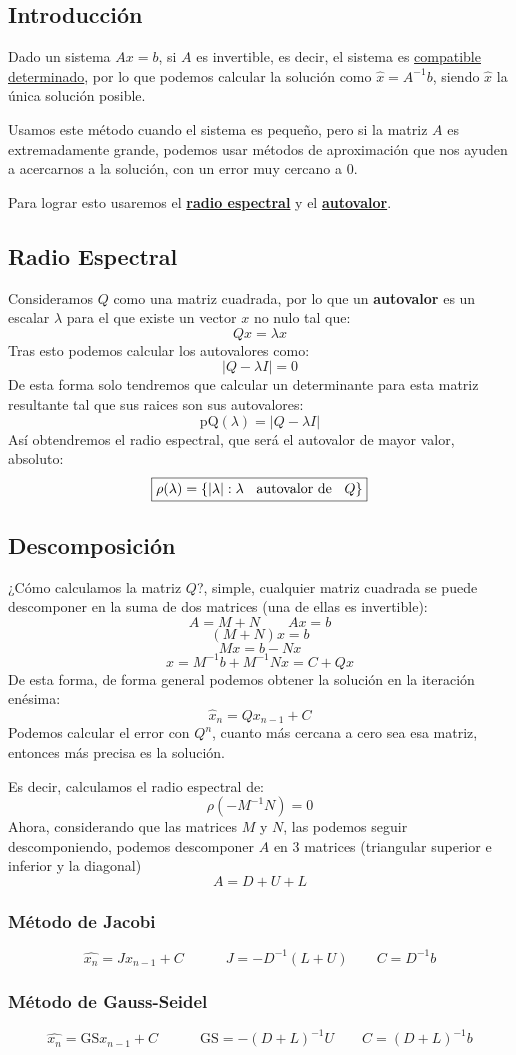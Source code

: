 \subsection{Introducción}
Dado un sistema \(Ax=b\), si \(A\) es invertible, es decir, el sistema es \underline{compatible determinado}, por lo que podemos calcular la solución como \(\hat{x} = A^{-1}b\), siendo \(\hat{x}\) la única solución posible. \par
Usamos este método cuando el sistema es pequeño, pero si la matriz \(A\) es extremadamente grande, podemos usar métodos de aproximación que nos ayuden a acercarnos a la solución, con un error muy cercano a 0. \par
Para lograr esto usaremos el \underline{\textbf{radio espectral}} y el \underline{\textbf{autovalor}}.
\subsection{Radio Espectral}
Consideramos \(Q\) como una matriz cuadrada, por lo que un \textbf{autovalor} es un escalar \(\lambda\) para el que existe un vector \(x\) no nulo tal que:
\[
        Qx = \lambda x
\]
Tras esto podemos calcular los autovalores como:
\[
        \boxed{\left | Q - \lambda I \right | = 0}
\]
De esta forma solo tendremos que calcular un determinante para esta matriz resultante tal que sus raices son sus autovalores:
\[
        \boxed{\text{pQ}(\lambda) = \left | Q - \lambda I \right |}
\]
Así obtendremos el radio espectral, que será el autovalor de mayor valor, absoluto:
\[
        \boxed{\rho(\lambda) = \left \{ \left | \lambda \right | : \lambda \text{\hspace{2mm} autovalor de \hspace{2mm}} Q \right \}}
\]
\subsection{Descomposición}
¿Cómo calculamos la matriz \(Q\)?, simple, cualquier matriz cuadrada se puede descomponer en la suma de dos matrices (una de ellas es invertible):
\[
        A = M + N \hspace{2em} Ax = b
\]
\[
        \left (  M + N\right )x = b
\]
\[
        Mx = b - Nx
\]
\[
        x = M^{-1}b + M^{-1}Nx = C +Qx
\]
De esta forma, de forma general podemos obtener la solución en la iteración enésima:
\[
        \boxed{\hat{x}_{n} = Qx_{n-1} + C}
\]
Podemos calcular el error con \(Q^n\), cuanto más cercana a cero sea esa matriz, entonces más precisa es la solución. \par Es decir, calculamos el radio espectral de:
\[
        \boxed{\rho(-M^{-1}N) = 0}
\]
Ahora, considerando que las matrices \(M\) y \(N\), las podemos seguir descomponiendo, podemos descomponer \(A\) en 3 matrices (triangular superior e inferior y la diagonal)
\[
        A = D + U + L
\]
\subsubsection{Método de Jacobi}
\[
        \boxed{\hat{x_n} = Jx_{n-1} + C} \hspace{3em} J = -D^{-1}(L+U) \hspace{2em} C = D^{-1}b
\]
\subsubsection{Método de Gauss-Seidel}
\[
        \boxed{\hat{x_n} = \text{GS}x_{n-1} + C} \hspace{3em} \text{GS} = -(D+L)^{-1}U \hspace{2em} C = (D+L)^{-1}b
\]